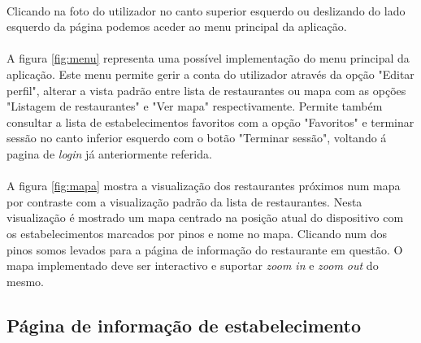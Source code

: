 \documentclass[a4paper,12pt]{scrreprt}
\begin{document}
\paragraph{}
Clicando na foto do utilizador no canto superior esquerdo ou deslizando do lado esquerdo da página podemos aceder ao menu principal da aplicação. 
\paragraph{}
A figura \ref{fig:menu} representa uma possível implementação do menu principal da aplicação. Este menu permite gerir a conta do utilizador através da opção "Editar perfil", alterar a vista padrão entre lista de restaurantes ou mapa com as opções "Listagem de restaurantes" e "Ver mapa" respectivamente. Permite também consultar a lista de estabelecimentos favoritos com a opção "Favoritos"  e terminar sessão no canto inferior esquerdo com o botão "Terminar sessão", voltando á pagina de \textit{login} já anteriormente referida.
\paragraph{}
A figura \ref{fig:mapa} mostra a visualização dos restaurantes próximos num mapa por contraste com a visualização padrão da lista de restaurantes. Nesta visualização é mostrado um mapa centrado na posição atual do dispositivo com os estabelecimentos marcados por pinos e nome no mapa. Clicando num dos pinos somos levados para a página de informação do restaurante em questão. O mapa implementado deve ser interactivo e suportar \textit{zoom in} e \textit{zoom out} do mesmo.
\subsection{Página de informação de estabelecimento}
\end{document}
